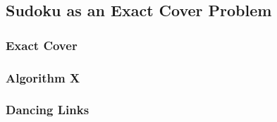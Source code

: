     \subsection{Sudoku as an Exact Cover Problem}
        \subsubsection{Exact Cover}
        
        \subsubsection{Algorithm X}
        
        \subsubsection{Dancing Links}

